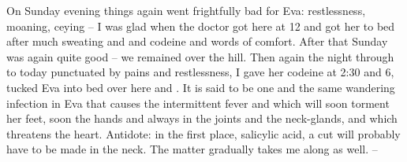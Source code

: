 
On Sunday evening things again went frightfully bad for Eva: restlessness, moaning, ceying -- I was glad when the doctor got here at 12 and got her to bed after much sweating and  and codeine and words of comfort. After that Sunday was again quite good -- we remained over the hill. Then again the night through to today punctuated by pains and restlessness, I gave her codeine at 2:30 and 6, tucked Eva into bed over here and . It is said to be one and the same wandering infection in Eva that causes the intermittent fever and which will soon torment her feet, soon the hands and always in the joints and the neck-glands, and which threatens the heart. Antidote: in the first place, salicylic acid, a cut will probably have to be made in the neck. The matter gradually takes me along as well. -- \missing